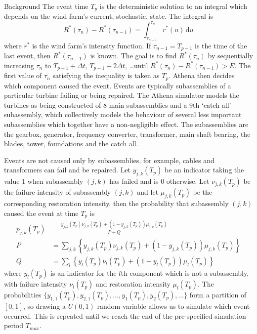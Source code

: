 \begin{chapter}{Background \label{Ch:background}}
The event time $T_p$ is the deterministic solution to an integral which depends on the wind farm's current, stochastic, state.
The integral is
\begin{equation}
R^{*}(\tau_n) - R^{*}(\tau_{n-1}) = \int_{\tau_{n-1}}^{\tau_n} r^{*}(u) \, \textrm{d} u  \label{Eq:intensity}
\end{equation}
where $r^{*}$ is the wind farm's intensity function. If $\tau_{n-1}=T_{p-1}$ is the time of the last event, then $R^{*}(\tau_{n-1})$ is known. The goal is to find $R^{*}(\tau_n)$ by sequentially increasing $\tau_{n}$ to $T_{p-1} + \Delta t$, $T_{p-1} + 2\Delta t$, \ldots until $R^{*}(\tau_n) - R^{*}(\tau_{n-1}) > E$. The first value of $\tau_{n}$ satisfying the inequality is taken as $T_p$. Athena then decides which component caused the event. Events are typically subassemblies of a particular turbine failing or being repaired. The Athena simulator models the turbines as being constructed of $8$ main subassemblies and a $9$th `catch all' subassembly, which collectively models the behaviour of several less important subassemblies which together have a non-negligible effect. The subassemblies are the gearbox, generator, frequency converter, transformer, main shaft bearing, the blades, tower, foundations and the catch all.

Events are not caused only by subassemblies, for example, cables and transformers can fail and be repaired. Let $y_{j,k}(T_p)$ be an indicator taking the value $1$ when subassembly $(j,k)$ has failed and is $0$ otherwise. Let $\nu_{j,k}(T_p)$ be the failure intensity of subassembly $(j,k)$ and let $\mu_{j,k}(T_p)$ be the corresponding restoration intensity, then the probability that subassembly $(j,k)$ caused the event at time $T_p$ is
\begin{align}
  p_{j,k}(T_p) &= \frac{y_{j,k}(T_p)\nu_{j,k}(T_p) + (1-y_{j,k}(T_p))\mu_{j,k}(T_p)}{P + Q} \\
  P & =   \sum_{j,k} \left\{y_{j,k}(T_p)\nu_{j,k}(T_p) + (1-y_{j,k}(T_p))\mu_{j,k}(T_p)\right\}\nonumber\\
 Q &= \sum_l \left\{ y_{l}(T_p)\nu_{l}(T_p) + (1-y_{l}(T_p))\mu_{l}(T_p) \right\}\nonumber
\end{align}
where $y_l(T_p)$ is an indicator for the $l$th component which is not a subassembly, with failure intensity $\nu_l(T_p)$ and restoration intensity $\mu_l(T_p)$. The probabilities $\{y_{1,1}(T_p), y_{2, 1}(T_p), \ldots, y_1(T_p), y_2(T_p), \ldots \}$ form a partition of $[0,1]$, so drawing a $U(0,1)$ random variable allows us to simulate which event occurred. This is repeated until we reach the end of the pre-specified simulation period $T_{max}$.


\end{chapter}
